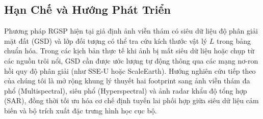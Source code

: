 \subsection{Hạn Chế và Hướng Phát Triển}
Phương pháp RGSP hiện tại giả định ảnh viễn thám có siêu dữ liệu độ phân giải mặt đất (GSD) và lớp đối tượng có thể tra cứu kích thước vật lý $L$ trong bảng chuẩn hóa. Trong các kịch bản thực tế khi ảnh bị mất siêu dữ liệu hoặc chụp từ các nguồn trôi nổi, GSD cần được ước lượng tự động thông qua các mạng nơ-ron hồi quy độ phân giải (như SSE-U hoặc ScaleEarth). Hướng nghiên cứu tiếp theo của chúng tôi là mở rộng khung lý thuyết hai footprint sang ảnh viễn thám đa phổ (Multispectral), siêu phổ (Hyperspectral) và ảnh radar khẩu độ tổng hợp (SAR), đồng thời tối ưu hóa cơ chế định tuyến lai phối hợp giữa siêu dữ liệu cảm biến và bộ trích xuất đặc trưng hình học cục bộ.
